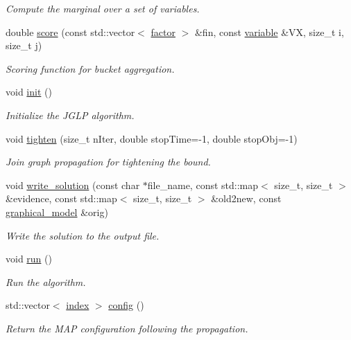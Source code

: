 \begin{DoxyCompactItemize}
\begin{DoxyCompactList}\small\item\em Compute the marginal over a set of variables. \end{DoxyCompactList}\item 
double \hyperlink{classmerlin_1_1jglp_acd88ee331ca7257fcc0ee1d70c2fe24c}{score} (const std\+::vector$<$ \hyperlink{classmerlin_1_1factor}{factor} $>$ \&fin, const \hyperlink{classmerlin_1_1variable}{variable} \&VX, size\+\_\+t i, size\+\_\+t j)
\begin{DoxyCompactList}\small\item\em Scoring function for bucket aggregation. \end{DoxyCompactList}\item 
void \hyperlink{classmerlin_1_1jglp_a834f4f3ac58d3286843ed1e1fb8552dc}{init} ()\hypertarget{classmerlin_1_1jglp_a834f4f3ac58d3286843ed1e1fb8552dc}{}\label{classmerlin_1_1jglp_a834f4f3ac58d3286843ed1e1fb8552dc}

\begin{DoxyCompactList}\small\item\em Initialize the J\+G\+LP algorithm. \end{DoxyCompactList}\item 
void \hyperlink{classmerlin_1_1jglp_a8b61916d0cdfb09f2f45ab47d6c00872}{tighten} (size\+\_\+t n\+Iter, double stop\+Time=-\/1, double stop\+Obj=-\/1)
\begin{DoxyCompactList}\small\item\em Join graph propagation for tightening the bound. \end{DoxyCompactList}\item 
void \hyperlink{classmerlin_1_1jglp_a7f4e708a4dca8d3ae759a658e5f91f3b}{write\+\_\+solution} (const char $\ast$file\+\_\+name, const std\+::map$<$ size\+\_\+t, size\+\_\+t $>$ \&evidence, const std\+::map$<$ size\+\_\+t, size\+\_\+t $>$ \&old2new, const \hyperlink{classmerlin_1_1graphical__model}{graphical\+\_\+model} \&orig)
\begin{DoxyCompactList}\small\item\em Write the solution to the output file. \end{DoxyCompactList}\item 
void \hyperlink{classmerlin_1_1jglp_aa748730ca6abbe2359fb2497da674fb8}{run} ()
\begin{DoxyCompactList}\small\item\em Run the algorithm. \end{DoxyCompactList}\item 
std\+::vector$<$ \hyperlink{classmerlin_1_1graph_a5cade38832f47248573e921276f122d6}{index} $>$ \hyperlink{classmerlin_1_1jglp_af75558eff4ccc1ad72acc1af5af3cc79}{config} ()\hypertarget{classmerlin_1_1jglp_af75558eff4ccc1ad72acc1af5af3cc79}{}\label{classmerlin_1_1jglp_af75558eff4ccc1ad72acc1af5af3cc79}

\begin{DoxyCompactList}\small\item\em Return the M\+AP configuration following the propagation. \end{DoxyCompactList}\end{DoxyCompactItemize}
